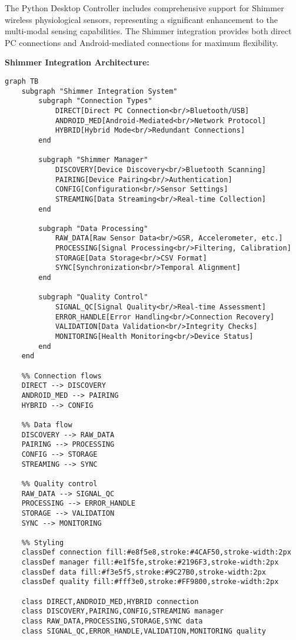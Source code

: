 \documentclass[11pt,a4paper]{article}
\begin{document}
The Python Desktop Controller includes comprehensive support for Shimmer wireless physiological sensors, representing a
significant enhancement to the multi-modal sensing capabilities. The Shimmer integration provides both direct PC
connections and Android-mediated connections for maximum flexibility.

\textbf{Shimmer Integration Architecture:}

\begin{verbatim}
graph TB
    subgraph "Shimmer Integration System"
        subgraph "Connection Types"
            DIRECT[Direct PC Connection<br/>Bluetooth/USB]
            ANDROID_MED[Android-Mediated<br/>Network Protocol]
            HYBRID[Hybrid Mode<br/>Redundant Connections]
        end

        subgraph "Shimmer Manager"
            DISCOVERY[Device Discovery<br/>Bluetooth Scanning]
            PAIRING[Device Pairing<br/>Authentication]
            CONFIG[Configuration<br/>Sensor Settings]
            STREAMING[Data Streaming<br/>Real-time Collection]
        end

        subgraph "Data Processing"
            RAW_DATA[Raw Sensor Data<br/>GSR, Accelerometer, etc.]
            PROCESSING[Signal Processing<br/>Filtering, Calibration]
            STORAGE[Data Storage<br/>CSV Format]
            SYNC[Synchronization<br/>Temporal Alignment]
        end

        subgraph "Quality Control"
            SIGNAL_QC[Signal Quality<br/>Real-time Assessment]
            ERROR_HANDLE[Error Handling<br/>Connection Recovery]
            VALIDATION[Data Validation<br/>Integrity Checks]
            MONITORING[Health Monitoring<br/>Device Status]
        end
    end

    %% Connection flows
    DIRECT --> DISCOVERY
    ANDROID_MED --> PAIRING
    HYBRID --> CONFIG

    %% Data flow
    DISCOVERY --> RAW_DATA
    PAIRING --> PROCESSING
    CONFIG --> STORAGE
    STREAMING --> SYNC

    %% Quality control
    RAW_DATA --> SIGNAL_QC
    PROCESSING --> ERROR_HANDLE
    STORAGE --> VALIDATION
    SYNC --> MONITORING

    %% Styling
    classDef connection fill:#e8f5e8,stroke:#4CAF50,stroke-width:2px
    classDef manager fill:#e1f5fe,stroke:#2196F3,stroke-width:2px
    classDef data fill:#f3e5f5,stroke:#9C27B0,stroke-width:2px
    classDef quality fill:#fff3e0,stroke:#FF9800,stroke-width:2px

    class DIRECT,ANDROID_MED,HYBRID connection
    class DISCOVERY,PAIRING,CONFIG,STREAMING manager
    class RAW_DATA,PROCESSING,STORAGE,SYNC data
    class SIGNAL_QC,ERROR_HANDLE,VALIDATION,MONITORING quality
\end{verbatim}
\end{document}
